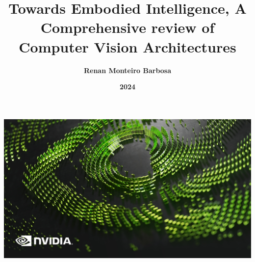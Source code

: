 \documentclass{beamer}
\begin{document}
{
{
    \includegraphics[width=\paperwidth,height=\paperheight]{images/Screenshot_9-12-2024_212019_.jpeg}
}
\title{\textbf{Towards Embodied Intelligence, A Comprehensive review of Computer Vision Architectures}}
\author[]{\textbf{Renan Monteiro Barbosa}}
\date[]{\textbf{2024}}
\maketitle
}

\end{document}
